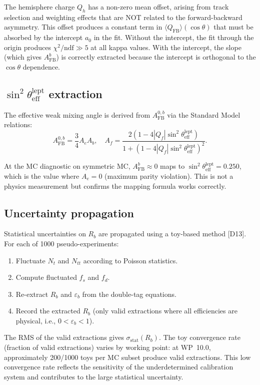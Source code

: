 \documentclass[11pt,a4paper]{article}
\begin{document}
The hemisphere charge $Q_h$ has a non-zero mean offset, arising from track selection
and weighting effects that are NOT related to the forward-backward asymmetry. This
offset produces a constant term in $\langle Q_\mathrm{FB} \rangle(\cos\theta)$ that
must be absorbed by the intercept $a_0$ in the fit. Without the intercept, the fit
through the origin produces $\chi^2/\mathrm{ndf} \gg 5$ at all kappa values. With
the intercept, the slope (which gives $A_\mathrm{FB}^b$) is correctly extracted because
the intercept is orthogonal to the $\cos\theta$ dependence.

\subsection{$\sin^2\theta_\mathrm{eff}^\mathrm{lept}$ extraction}
\label{sec:stat_sin2theta}

The effective weak mixing angle is derived from $A_\mathrm{FB}^{0,b}$ via the Standard
Model relations:
\begin{equation}
A_\mathrm{FB}^{0,b} = \frac{3}{4} A_e A_b, \quad
A_f = \frac{2(1 - 4|Q_f|\sin^2\theta_\mathrm{eff}^\mathrm{lept})}{1 + (1 - 4|Q_f|\sin^2\theta_\mathrm{eff}^\mathrm{lept})^2}.
\label{eq:sin2theta}
\end{equation}

At the MC diagnostic on symmetric MC, $A_\mathrm{FB}^b \approx 0$ maps to
$\sin^2\theta_\mathrm{eff}^\mathrm{lept} = 0.250$, which is the value where $A_e = 0$
(maximum parity violation). This is not a physics measurement but confirms the
mapping formula works correctly.

\subsection{Uncertainty propagation}
\label{sec:uncertainty_propagation}

Statistical uncertainties on $R_b$ are propagated using a toy-based method [D13].
For each of 1000 pseudo-experiments:
\begin{enumerate}
\item Fluctuate $N_t$ and $N_{tt}$ according to Poisson statistics.
\item Compute fluctuated $f_s$ and $f_d$.
\item Re-extract $R_b$ and $\varepsilon_b$ from the double-tag equations.
\item Record the extracted $R_b$ (only valid extractions where all efficiencies
are physical, i.e., $0 < \varepsilon_b < 1$).
\end{enumerate}
The RMS of the valid extractions gives $\sigma_\mathrm{stat}(R_b)$. The toy
convergence rate (fraction of valid extractions) varies by working point:
at WP~10.0, approximately 200/1000 toys per MC subset produce valid extractions.
This low convergence rate reflects the sensitivity of the underdetermined
calibration system and contributes to the large statistical uncertainty.
\end{document}
